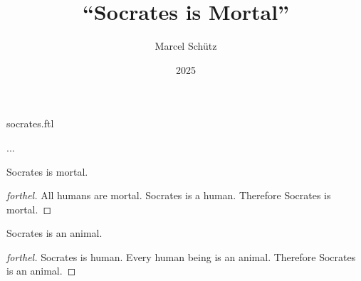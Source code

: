 \documentclass{article}
\title{``Socrates is Mortal''}
\author{Marcel Schütz}
\date{2025}
\begin{document}
\begin{smodule}{socrates.ftl}
\maketitle


\noindent ...

\begin{theorem}[forthel,title=Mill's Syllogism,id=mill_syllogism]
  Socrates is mortal.
\end{theorem}
\begin{proof}[forthel]
  All humans are mortal.
  Socrates is a human.
  Therefore Socrates is mortal.
\end{proof}

\begin{theorem}[forthel,title=Sextus Empiricus' Syllogism,id=sextus_empiricus_syllogism]
  Socrates is an animal.
\end{theorem}
\begin{proof}[forthel]
  Socrates is human.
  Every human being is an animal.
  Therefore Socrates is an animal.
\end{proof}

\printbibliography
{}

\end{smodule}
\end{document}
